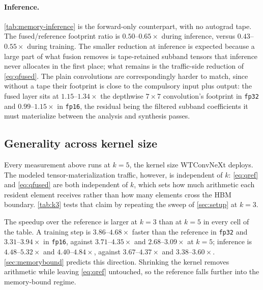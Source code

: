 \documentclass[10pt]{article} %
\theoremstyle{plain}
\begin{document}


\paragraph{Inference.}
\label{sec:results-memory-inference}
\autoref{tab:memory-inference} is the forward-only counterpart, with no autograd
tape. The fused/reference footprint ratio is $0.50$--$0.65\times$ during inference,
versus $0.43$--$0.55\times$ during training. The smaller reduction at inference is
expected because a large part of what fusion removes is tape-retained subband
tensors that inference never allocates in the first place; what remains is the
traffic-side reduction of \autoref{eq:qfused}. The plain convolutions are
correspondingly harder to match, since without a tape their footprint is close to
the compulsory input plus output: the fused layer sits at $1.15$--$1.34\times$ the
depthwise $7\times7$ convolution's footprint in \texttt{fp32} and
$0.99$--$1.15\times$ in \texttt{fp16}, the residual being the filtered subband
coefficients it must materialize between the analysis and synthesis passes.

\subsection{Generality across kernel size}
\label{sec:results-kernel-size}



Every measurement above runs at $k{=}5$, the kernel size WTConvNeXt deploys. The modeled
tensor-materialization traffic, however, is independent of $k$: \autoref{eq:qref} and
\autoref{eq:qfused} are both independent of $k$, which sets how much arithmetic each resident
element receives rather than how many elements cross the HBM boundary. \autoref{tab:k3} tests
that claim by repeating the sweep of \autoref{sec:setup} at $k{=}3$.

The speedup over the reference is larger at $k{=}3$ than at $k{=}5$ in every cell of the table. A
training step is $3.86$--$4.68\times$ faster than the reference in \texttt{fp32} and
$3.31$--$3.94\times$ in \texttt{fp16}, against $3.71$--$4.35\times$ and $2.68$--$3.09\times$ at
$k{=}5$; inference is $4.48$--$5.32\times$ and $4.40$--$4.84\times$, against $3.67$--$4.37\times$
and $3.38$--$3.60\times$. \autoref{sec:memorybound} predicts this direction. Shrinking the kernel
removes arithmetic while leaving \autoref{eq:qref} untouched, so the reference falls further into
the memory-bound regime.
\end{document}
